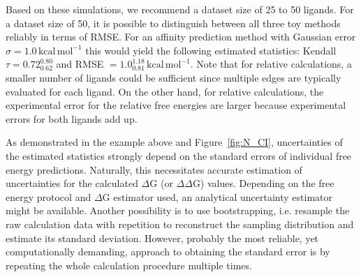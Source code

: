 \documentclass[9pt,bestpractices]{livecoms}
\begin{document}
Based on these simulations, we recommend a dataset size of 25 to 50 ligands. For a dataset size of 50, it is possible to distinguish between all three toy methods reliably in terms of RMSE. For an affinity prediction method with Gaussian error $\sigma = 1.0\,\mathrm{kcal\,mol^{-1}}$ this would yield the following estimated statistics: Kendall $\tau = 0.72_{0.62}^{0.80}$ and RMSE $= 1.0_{0.81}^{1.18}\,\mathrm{kcal\,mol^{-1}}$. Note that for relative calculations, a smaller number of ligands could be sufficient since multiple edges are typically evaluated for each ligand. On the other hand, for relative calculations, the experimental error for the relative free energies are larger because experimental errors for both ligands add up. 

As demonstrated in the example above and Figure~\ref{fig:N_CI}, uncertainties of the estimated statistics strongly depend on the standard errors of individual free energy predictions. Naturally, this necessitates accurate estimation of uncertainties for the calculated $\Delta$G (or $\Delta\Delta$G) values. Depending on the free energy protocol and $\Delta$G estimator used, an analytical uncertainty estimator might be available. Another possibility is to use bootstrapping, i.e. resample the raw calculation data with repetition to reconstruct the sampling distribution and estimate its standard deviation. However, probably the most reliable, yet computationally demanding, approach to obtaining the standard error is by repeating the whole calculation procedure multiple times.~\cite{knapp2018replicas,gapsys2020replicas,wan2021uncertainty}
\end{document}
